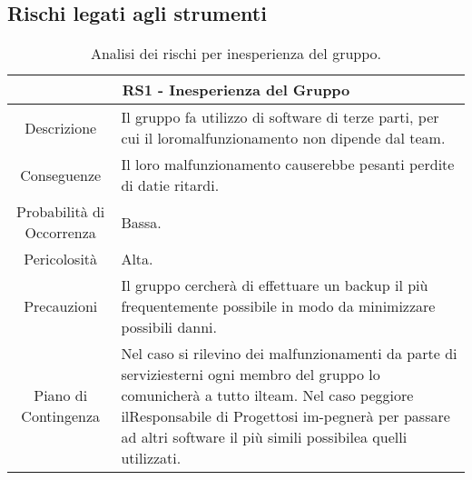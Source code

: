 \subsection{Rischi legati agli strumenti}

\begin{table}[H]
    \begin{tabular}{|c | p{10cm}|}
    \hline
    \multicolumn{2}{|c|}{\textbf{RS1 - Inesperienza del Gruppo}} \\
    \hline
    Descrizione & Il gruppo fa utilizzo di software di terze parti, per cui il loromalfunzionamento non dipende dal team.\\ 
    \hline
    Conseguenze & Il loro malfunzionamento causerebbe pesanti perdite di datie ritardi.\\
    \hline
    Probabilità di Occorrenza & Bassa.\\
    \hline
    Pericolosità & Alta.\\
    \hline
    Precauzioni & Il gruppo cercherà di effettuare un backup il più frequentemente possibile in modo da minimizzare possibili danni.\\ 
    \hline
    Piano di Contingenza & Nel caso si rilevino dei malfunzionamenti da parte di serviziesterni ogni membro del gruppo lo comunicherà a tutto ilteam. Nel caso peggiore ilResponsabile di Progettosi im-pegnerà per passare ad altri software il più simili possibilea quelli utilizzati.\\ 
    \hline
    \end{tabular}
    \caption{\label{tab:RS1}Analisi dei rischi per inesperienza del gruppo.}
    
\end{table}